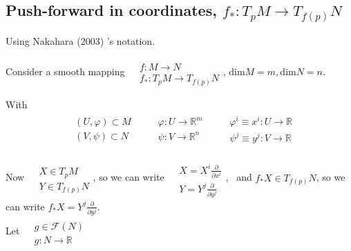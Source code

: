\subsection{Push-forward in coordinates, $f_*  : T_p M \to T_{f(p)}N$}

Using Nakahara (2003) \cite{dgdt:Naka2003}'s notation.

Consider a smooth mapping $\begin{aligned} & \quad \\ 
		& f : M \to N \\
		& f_* : T_p M \to T_{f(p)}N \end{aligned}$, $\text{dim}M = m, \text{dim}N = n$.
	
With
\[
\begin{gathered}
\begin{aligned}
	& (U, \varphi) \subset M \\
	& (V, \psi) \subset N
\end{aligned} \quad \, \begin{aligned}
& \varphi: U \to \mathbb{R}^m \\
& \psi: V \to \mathbb{R}^n 
\end{aligned} \quad \, \begin{aligned}
& \varphi^i \equiv x^i : U \to \mathbb{R} \\ 
& \psi^j \equiv y^j : V \to \mathbb{R} 
\end{aligned}
\end{gathered}
\]

Now $\begin{aligned} & \quad \\ 
	& X \in T_p M \\ 
	& Y \in T_{f(p)} N \end{aligned}$, so we can write $\begin{aligned} & \quad \\ 
	& X = X^i \frac{\partial }{ \partial x^i} \\ 
	& Y = Y^j \frac{ \partial }{ \partial y^j } \end{aligned}$, \, and $f_* X \in T_{f(p)}N$, so we can write $f_* X = Y^j \frac{\partial }{ \partial y^j}$. \\

Let $\begin{aligned} & \quad \\ 
	 & g\in \mathcal{F}(N) \\
	 & g: N \to \mathbb{R} \end{aligned}$ \\
 
